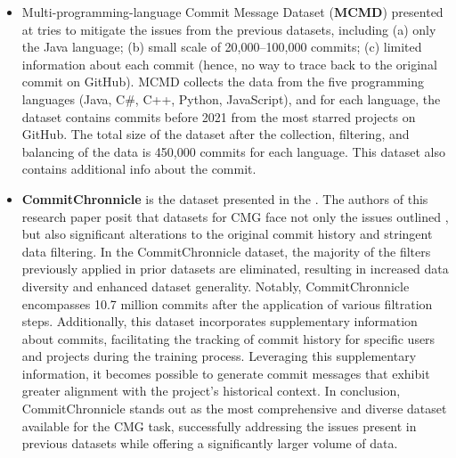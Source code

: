 \begin{itemize}
    \item Multi-programming-language Commit Message Dataset (\textbf{MCMD}) presented at{ }\cite{tao2021evaluation}  tries to mitigate the issues from the previous datasets, including (a) only the Java language; (b) small scale of 20,000–100,000 commits; (c) limited information about each commit (hence, no way to trace back to the original commit on GitHub). MCMD collects the data from the five programming languages (Java, C\#, C++, Python, JavaScript), and for each language, the dataset contains commits before 2021 from the most starred projects on GitHub. The total size of the dataset after the collection, filtering, and balancing of the data is  450,000 commits for each language. This dataset also contains additional info about the commit.

    \item \textbf{CommitChronnicle} is the dataset presented in the{ }\cite{eliseeva2023commit}. The authors of this research paper posit that datasets for CMG face not only the issues outlined{ }\cite{tao2021evaluation}, but also significant alterations to the original commit history and stringent data filtering. In the CommitChronnicle dataset, the majority of the filters previously applied in prior datasets are eliminated, resulting in increased data diversity and enhanced dataset generality. Notably, CommitChronnicle encompasses 10.7 million commits after the application of various filtration steps. Additionally, this dataset incorporates supplementary information about commits, facilitating the tracking of commit history for specific users and projects during the training process. Leveraging this supplementary information, it becomes possible to generate commit messages that exhibit greater alignment with the project's historical context. In conclusion, CommitChronnicle stands out as the most comprehensive and diverse dataset available for the CMG task, successfully addressing the issues present in previous datasets while offering a significantly larger volume of data.
\end{itemize}

